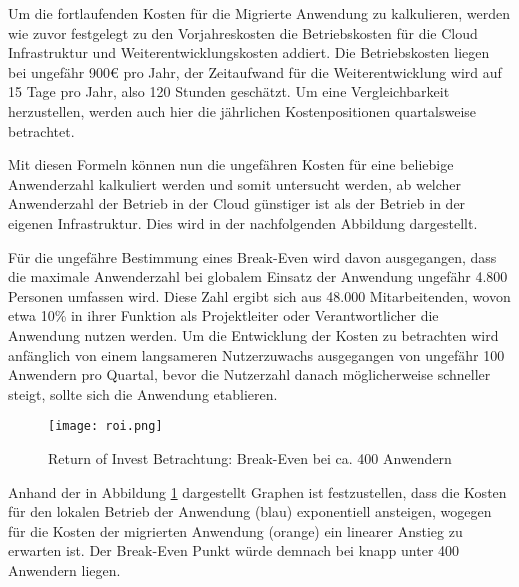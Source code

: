 Um die fortlaufenden Kosten für die Migrierte Anwendung zu kalkulieren, werden wie zuvor festgelegt zu den Vorjahreskosten die Betriebskosten für die Cloud Infrastruktur und Weiterentwicklungskosten addiert. Die Betriebskosten liegen bei ungefähr 900€ pro Jahr, der Zeitaufwand für die Weiterentwicklung wird auf 15 Tage pro Jahr, also 120 Stunden geschätzt. Um eine Vergleichbarkeit herzustellen, werden auch hier die jährlichen Kostenpositionen quartalsweise betrachtet.

Mit diesen Formeln können nun die ungefähren Kosten für eine beliebige Anwenderzahl kalkuliert werden und somit untersucht werden, ab welcher Anwenderzahl der Betrieb in der Cloud günstiger ist als der Betrieb in der eigenen Infrastruktur. Dies wird in der nachfolgenden Abbildung dargestellt. \pagebreak

Für die ungefähre Bestimmung eines Break-Even wird davon ausgegangen, dass die maximale Anwenderzahl bei globalem Einsatz der Anwendung ungefähr 4.800 Personen umfassen wird. Diese Zahl ergibt sich aus 48.000 Mitarbeitenden, wovon etwa 10\% in ihrer Funktion als Projektleiter oder Verantwortlicher die Anwendung nutzen werden. Um die Entwicklung der Kosten zu betrachten wird anfänglich von einem langsameren Nutzerzuwachs ausgegangen von ungefähr 100 Anwendern pro Quartal, bevor die Nutzerzahl danach möglicherweise schneller steigt, sollte sich die Anwendung etablieren.

\begin{figure}[H]
    \centering
    \texttt{[image: roi.png]}
    \caption{Return of Invest Betrachtung: Break-Even bei ca. 400 Anwendern}
    \label{fig:roi}
\end{figure}

Anhand der in Abbildung \ref{fig:roi} dargestellt Graphen ist festzustellen, dass die Kosten für den lokalen Betrieb der Anwendung (blau) exponentiell ansteigen, wogegen für die Kosten der migrierten Anwendung (orange) ein linearer Anstieg zu erwarten ist. Der Break-Even Punkt würde demnach bei knapp unter 400 Anwendern liegen.




